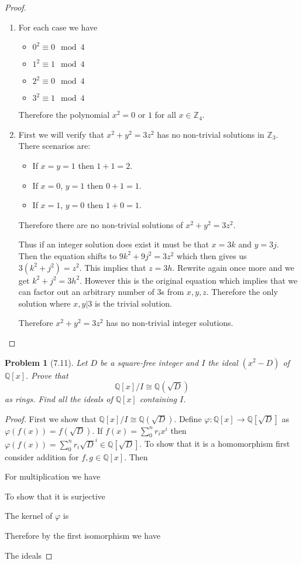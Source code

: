 \documentclass[10pt]{article}
\newcommand{\sk}{\vskip 10mm}
\newcommand{\bb}[1]{\mathbb{#1}}
\theoremstyle{plain}
\newtheorem{problem}{Problem}
\theoremstyle{remark}
\begin{document}
\begin{proof}
  \begin{enumerate}
  \item For each case we have
    \begin{itemize}
    \item $0^2\equiv 0 \mod 4$
    \item $1^2\equiv 1 \mod 4$
    \item $2^2\equiv 0 \mod 4$
    \item $3^2\equiv 1 \mod 4$
    \end{itemize}
    Therefore the polynomial $x^2=0$ or $1$ for all $x\in\bb{Z}_4$.
  \item First we will verify that $x^2+y^2=3z^2$ has no non-trivial solutions in
    $\bb{Z}_3$. There scenarios are:
    \begin{itemize}
    \item If $x=y=1$ then $1+1=2$.
    \item If $x=0$, $y=1$ then $0+1=1$.
    \item If $x=1$, $y=0$ then $1+0=1$.
    \end{itemize}
    Therefore there are no non-trivial solutions of $x^2+y^2=3z^2$.

    Thus if an integer solution does exist it must be that $x=3k$ and $y=3j$.
    Then the equation shifts to $9k^2+9j^2=3z^2$ which then gives us
    $3(k^2+j^2)=z^2$. This implies that $z=3h$. Rewrite again once
    more and we get $k^2+j^2=3h^2$. However this is the original equation
    which implies that we can factor out an arbitrary number of $3$s from
    $x,y,z$. Therefore the only solution where $x,y|3$ is the trivial solution.

    Therefore $x^2+y^2=3z^2$ has no non-trivial integer solutions.
  \end{enumerate}
\end{proof}

\sk

\begin{problem}[7.11]
  Let $D$ be a square-free integer and $I$ the ideal $(x^2-D)$ of $\bb{Q}[x]$.
  Prove that
  \[ \bb{Q}[x]/I\cong\bb{Q}(\sqrt{D}) \]
  as rings. Find all the ideals of $\bb{Q}[x]$ containing $I$.
\end{problem}

\begin{proof}
  First we show that $\bb{Q}[x]/I\cong\bb{Q}(\sqrt{D})$. Define
  $\varphi:\bb{Q}[x]\rightarrow \bb{Q}[\sqrt{D}]$ as $\varphi(f(x))=f(\sqrt{D})$. If
  $f(x)=\sum_0^nr_ix^i$ then $\varphi(f(x))=\sum_0^nr_i\sqrt{D}^{i}\in\bb{Q}[\sqrt{D}]$.
  To show that it is a homomorphism first consider addition for $f,g\in\bb{Q}[x]$.
  Then

  For multiplication we have

  To show that it is surjective

  The kernel of $\varphi$ is 

  Therefore by the first isomorphism we have

  The ideals 
\end{proof}

\end{document}
